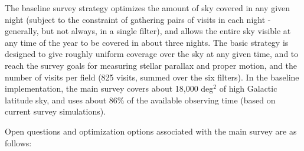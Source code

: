\documentclass[DM,lsstdraft,toc,usenatbib]{lsstdoc}
\begin{document}
The baseline survey strategy optimizes the amount of sky covered in any given night (subject to 
the constraint of gathering pairs of visits in each night - generally, but not always, in a single filter), 
and allows the entire sky visible at any time of the year to be covered in about three nights. 
The basic strategy is designed to give roughly uniform coverage over the sky at any given time, and to reach
the survey goals for measuring stellar parallax and proper motion, and the number of visits per 
field (825 visits, summed over the six filters). In the baseline implementation, the main survey 
covers about 18,000 deg$^2$ of high Galactic latitude sky, and uses about 86\% of the available 
observing time (based on current survey simulations). 

Open questions and optimization options associated with the main survey are as follows: 
\end{document}
